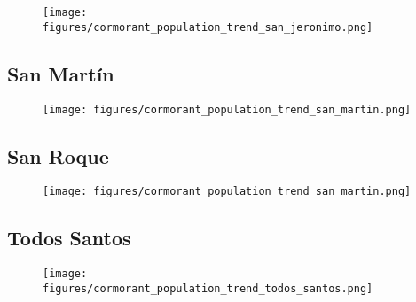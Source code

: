 \documentclass{article} %
\begin{document}
\begin{figure}[H]
\hspace{-2cm}
    \texttt{[image: figures/cormorant\_population\_trend\_san\_jeronimo.png]}
\caption{}
\end{figure}

\subsection*{San Martín}

\begin{figure}[H]
\hspace{-2cm}
    \texttt{[image: figures/cormorant\_population\_trend\_san\_martin.png]}
\caption{}
\end{figure}

\subsection*{San Roque}

\begin{figure}[H]
\hspace{-2cm}
    \texttt{[image: figures/cormorant\_population\_trend\_san\_martin.png]}
\caption{}
\end{figure}

\subsection*{Todos Santos}

\begin{figure}[H]
\hspace{-2cm}
    \texttt{[image: figures/cormorant\_population\_trend\_todos\_santos.png]}
\caption{}
\end{figure}

 

\end{document}
